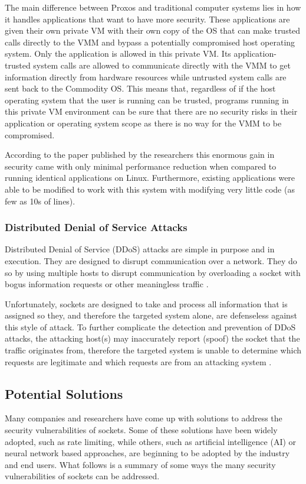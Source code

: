 \documentclass[conference, 12pt]{IEEEtran}
\begin{document}
The main difference between Proxos and traditional computer systems lies in how it handles applications that want to have more security. These applications are given their own private VM with their own copy of the OS that can make trusted calls directly to the VMM and bypass a potentially compromised host operating system. Only the application is allowed in this private VM. Its application-trusted system calls are allowed to communicate directly with the VMM to get information directly from hardware resources while untrusted system calls are sent back to the Commodity OS\cite{Richard}. This means that, regardless of if the host operating system that the user is running can be trusted, programs running in this private VM environment can be sure that there are no security risks in their application or operating system scope as there is no way for the VMM to be compromised.

According to the paper published by the researchers this enormous gain in security came with only minimal performance reduction when compared to running identical applications on Linux. Furthermore, existing applications were able to be modified to work with this system with modifying very little code (as few as 10s of lines).

\subsubsection{Distributed Denial of Service Attacks}
Distributed Denial of Service (DDoS) attacks are simple in purpose and in execution. They are designed to disrupt communication over a network. They do so by using multiple hosts to disrupt communication by overloading a socket with bogus information requests or other meaningless traffic \cite{Herbert}.

Unfortunately, sockets are designed to take and process all information that is assigned so they, and therefore the targeted system alone, are defenseless against this style of attack. To further complicate the detection and prevention of DDoS attacks, the attacking host(s) may inaccurately report (spoof) the socket that the traffic originates from, therefore the targeted system is unable to determine which requests are legitimate and which requests are from an attacking system \cite{Herbert}.

\subsection{Potential Solutions}
Many companies and researchers have come up with solutions to address the security vulnerabilities of sockets. Some of these solutions have been widely adopted, such as rate limiting, while others, such as artificial intelligence (AI) or neural network based approaches, are beginning to be adopted by the industry and end users. What follows is a summary of some ways the many security vulnerabilities of sockets can be addressed.
\end{document}
